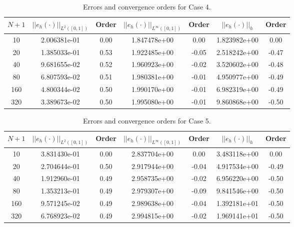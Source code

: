 \documentclass[a4paper, 12pt]{article}
\begin{document}
\begin{table}[!ht]
\caption{Errors and convergence orders for Case 4.}
\vspace{0.1in}
\centering
\begin{tabular}{|c|c|c| c| c| c| c|}
\hline
 $N+1$&  $||e_h(\cdot)||_{L^2([0,1])}$ & Order  & $||e_h(\cdot)||_{L^\infty([0,1])}$ & Order& $||e_h(\cdot)||_h$& Order \\
 \hline
     10  & 2.006381e-01 & 0.00  & 1.847478e+00 & 0.00  &1.823982e+00  & 0.00 \\
     20  & 1.385033e-01 & 0.53 &  1.922485e+00&  -0.05& 2.518242e+00 & -0.47\\
     40  & 9.681655e-02 & 0.52 &  1.960923e+00&  -0.02& 3.520602e+00 & -0.48\\
     80  & 6.807593e-02 & 0.51 &  1.980381e+00&  -0.01& 4.950977e+00 & -0.49\\
     160 & 4.800344e-02 & 0.50 &  1.990170e+00&  -0.01& 6.982319e+00 & -0.49\\
     320 & 3.389673e-02 & 0.50 &  1.995080e+00&  -0.01& 9.860868e+00 & -0.50\\
\hline
\end{tabular}
\label{tab:C4}
\end{table}

\begin{table}[!ht]
\caption{Errors and convergence orders for Case 5.}
\vspace{0.1in}
\centering
\begin{tabular}{|c|c|c| c| c| c| c|}
\hline
 $N+1$&  $||e_h(\cdot)||_{L^2([0,1])}$ & Order  & $||e_h(\cdot)||_{L^\infty([0,1])}$ & Order& $||e_h(\cdot)||_h$& Order \\
 \hline
     10  & 3.831430e-01 & 0.00 & 2.837704e+00 & 0.00  & 3.483118e+00 & 0.00\\
     20  & 2.704644e-01 & 0.50 & 2.917944e+00 & -0.04 & 4.917534e+00 & -0.49\\
     40  & 1.912960e-01 & 0.49 & 2.958735e+00 & -0.02 & 6.956220e+00 & -0.50\\
     80  & 1.353213e-01 & 0.49 & 2.979307e+00 & -0.09 & 9.841546e+00 & -0.50\\
     160 & 9.571245e-02 & 0.49 & 2.989638e+00 & -0.04 & 1.392181e+01 & -0.50\\
     320 & 6.768923e-02 & 0.49 & 2.994815e+00 & -0.02 & 1.969141e+01 & -0.50\\
\hline
\end{tabular}
\label{tab:C5}
\end{table}
\end{document}
